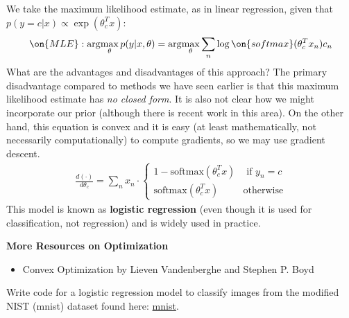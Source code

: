 \documentclass{article}
\begin{document}
We take the maximum likelihood estimate, as in linear regression, given that $p(y = c | x) \propto \exp(\theta_c^T x)$: 
$$ \on{MLE}: \arg\!\max_{\theta} p(y | x, \theta) = \arg\!\max_{\theta} \sum_n \log \on{softmax} (\theta_c^T x_n) c_n $$
What are the advantages and disadvantages of this approach? The primary disadvantage compared to methods we have seen earlier is that this maximum likelihood estimate has \textit{no closed form}. It is also not clear how we might incorporate our prior (although there is recent work in this area). On the other hand, this equation is convex and it is easy (at least mathematically, not necessarily computationally) to compute gradients, so we may use gradient descent. 
\begin{align} 
    \frac{d (\cdot)}{d \theta_c} = \sum_n x_n \cdot \begin{cases} 1 - \text{softmax}(\theta_c ^T x) & \text{ if } y_n = c \\ \text{softmax}(\theta_c ^T x) & \text{otherwise} \end{cases} 
\end{align}
This model is known as \textbf{logistic regression} (even though it is used for classification, not regression) and is widely used in practice.

\medskip

\textbf{More Resources on Optimization}
\begin{itemize}
    \item Convex Optimization by Lieven Vandenberghe and Stephen P. Boyd
\end{itemize}

\begin{exercise} 
Write code for a logistic regression model to classify images from the modified NIST (mnist) dataset found here: \href{http://deeplearning.net/tutorial/gettingstarted.html}{mnist}.

\end{exercise}
\end{document}
